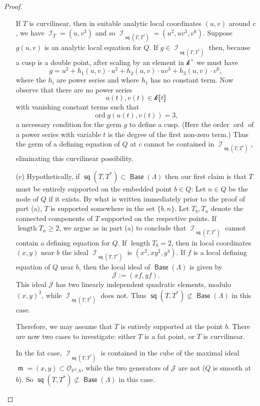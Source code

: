 \documentclass{article}
\renewcommand{\P}{\mathbb{P}}
\renewcommand{\k}{\mathscr{k}}
\DeclareMathOperator{\I}{\mathcal{I}}
\renewcommand{\O}{\mathcal{O}}
\DeclareMathOperator{\s}{\mathsf{sq}}
\DeclareMathOperator{\Base}{\mathsf{Base}}
\DeclareMathOperator{\m}{\mathfrak{m}}
\DeclareMathOperator{\ord}{ord}
\DeclareMathOperator{\length}{length}
\begin{document}
\begin{proof}
\begin{enumerate}
        If $T$ is curvilinear, then in suitable analytic local coordinates $(u,v)$ around $c$, we have $\I_{T} = (u,v^{3})$ and so $\I_{\s(T,T^{*})} = (u^{2},uv^{3},v^{6})$. Suppose $g(u,v)$ is an analytic local equation for $Q$. If $g \in \I_{\s(T,T^{*})}$ then, because a cusp is a double point, after scaling by an element in $\k^{\times}$ we must have $$g = u^{2} + h_1(u,v) \cdot u^{2} + h_2(u,v) \cdot uv^{3} + h_{3}(u,v) \cdot v^{6},$$ where the $h_{i}$ are power series and where $h_{1}$ has no constant term.  Now observe that there are no power series $$u(t),v(t) \in \k \llbracket t \rrbracket$$ with vanishing constant terms such that $$\ord g(u(t),v(t)) = 3,$$ a necessary condition for the germ $g$ to define a cusp. (Here the order $\ord$ of a power series with variable $t$ is the degree of the first non-zero term.) Thus the germ of a defining equation of $Q$ at $c$ cannot be contained in $\I_{\s(T,T^{*})}$, eliminating this curvilinear possibility. 

        \item[(c)] Hypothetically, if  $\s(T,T^{*}) \subset \Base (\Lambda)$ then our first claim is that $T$ must be entirely supported on the embedded point $b \in Q$:  Let $n \in Q$ be the node of $Q$ if it exists. By what is written immediately prior to the proof of part (a),  $T$ is supported somewhere in the set $\{b,n\}$. Let $T_{b}, T_{n}$ denote the connected components of $T$ supported on the respective points.  If $\length T_{n} \geq 2$, we argue as in part (a) to conclude that $\I_{\s(T,T^{*})}$ cannot contain a defining equation for $Q$.  If $\length T_{b} = 2$, then in local coordinates $(x,y)$ near $b$ the ideal $\I_{\s(T,T^{*})}$ is $(x^{2},xy^{2},y^{4})$. If  $f$ is a local defining equation of $Q$ near $b$, then the local ideal of $\Base (\Lambda)$ is given by $$\mathcal{J} := (xf,yf).$$  This ideal $\mathcal{J}$ has two linearly independent quadratic elements, modulo $(x,y)^{3}$, while $\I_{\s(T,T^{*})}$ does not.  Thus $\s(T,T^{*}) \nsubset \Base (\Lambda)$ in this case. 
        
        Therefore, we may assume that $T$ is entirely supported at the point $b$.  There are now two cases to investigate: either $T$ is a fat point, or $T$ is curvilinear. 
        
        In the fat case, $\I_{\s(T,T^*)}$ is contained in the cube of the maximal ideal $\m = (x,y) \subset \O_{\P^{2},b}$, while the two generators of $\mathcal{J}$ are not ($Q$ is smooth at $b$). So $\s(T,T^{*}) \not\subset \Base(\Lambda)$ in this case. 
        

\end{enumerate}
\end{proof}
\end{document}
